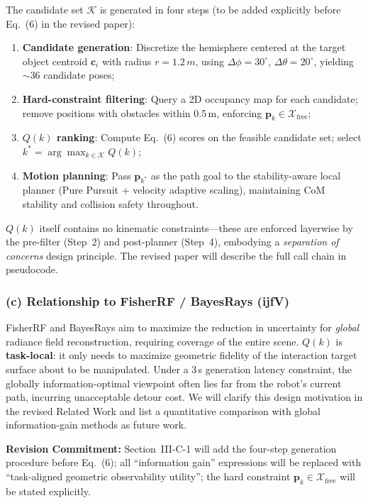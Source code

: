 \documentclass[10pt,a4paper]{article}
\newcommand{\commitbox}[1]{\smallskip\noindent\textbf{Revision Commitment:} #1\smallskip}
\begin{document}
The candidate set $\mathcal{K}$ is generated in four steps (to be added explicitly before Eq.~(6) in the revised paper):
\begin{enumerate}[leftmargin=2em,topsep=2pt,itemsep=1pt]
  \item \textbf{Candidate generation}: Discretize the hemisphere centered at the target object centroid $\mathbf{c}_i$ with radius $r=1.2\,m$, using $\Delta\phi=30^\circ$, $\Delta\theta=20^\circ$, yielding ${\sim}$36 candidate poses;
  \item \textbf{Hard-constraint filtering}: Query a 2D occupancy map for each candidate; remove positions with obstacles within 0.5\,m, enforcing $\mathbf{p}_k\in\mathcal{X}_{\text{free}}$;
  \item \textbf{$Q(k)$ ranking}: Compute Eq.~(6) scores on the feasible candidate set; select $k^*=\arg\max_{k\in\mathcal{K}}Q(k)$;
  \item \textbf{Motion planning}: Pass $\mathbf{p}_{k^*}$ as the path goal to the stability-aware local planner (Pure Pursuit + velocity adaptive scaling), maintaining CoM stability and collision safety throughout.
\end{enumerate}
$Q(k)$ itself contains no kinematic constraints---these are enforced layerwise by the pre-filter (Step~2) and post-planner (Step~4), embodying a \emph{separation of concerns} design principle. The revised paper will describe the full call chain in pseudocode.

\subsubsection*{(c) Relationship to FisherRF / BayesRays (ijfV)}

FisherRF and BayesRays aim to maximize the reduction in uncertainty for \emph{global} radiance field reconstruction, requiring coverage of the entire scene. $Q(k)$ is \textbf{task-local}: it only needs to maximize geometric fidelity of the interaction target surface about to be manipulated. Under a 3\,s generation latency constraint, the globally information-optimal viewpoint often lies far from the robot's current path, incurring unacceptable detour cost. We will clarify this design motivation in the revised Related Work and list a quantitative comparison with global information-gain methods as future work.

\commitbox{Section~III-C-1 will add the four-step generation procedure before Eq.~(6); all ``information gain'' expressions will be replaced with ``task-aligned geometric observability utility''; the hard constraint $\mathbf{p}_k\in\mathcal{X}_{\text{free}}$ will be stated explicitly.}
\end{document}
